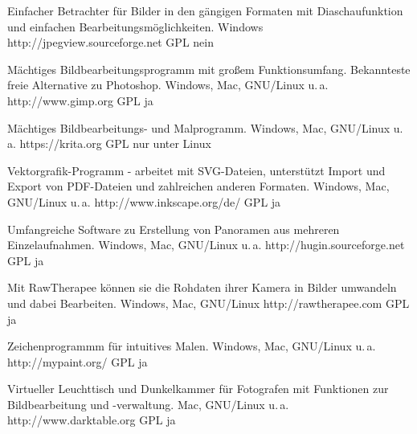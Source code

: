 



{Einfacher Betrachter für Bilder in den gängigen Formaten mit Diaschaufunktion und einfachen Bearbeitungsmöglichkeiten.}
{Windows}
{http://jpegview.sourceforge.net}
{GPL}
{nein}

{Mächtiges Bildbearbeitungsprogramm mit großem Funktionsumfang. Bekannteste freie Alternative zu Photoshop.}
{Windows, Mac, GNU/Linux u.\,a.}
{http://www.gimp.org}
{GPL}
{ja}

{Mächtiges Bildbearbeitungs- und Malprogramm.}
{Windows, Mac, GNU/Linux u.\,a.}
{https://krita.org}
{GPL}
{nur unter Linux}

{Vektorgrafik-Programm - arbeitet mit SVG-Dateien, unterstützt Import und Export von PDF-Dateien und zahlreichen anderen Formaten.}
{Windows, Mac, GNU/Linux u.\,a.}
{http://www.inkscape.org/de/}
{GPL}
{ja}


{Umfangreiche Software zu Erstellung von Panoramen aus mehreren Einzelaufnahmen.}
{Windows, Mac, GNU/Linux u.\,a.}
{http://hugin.sourceforge.net}
{GPL}
{ja}

{Mit RawTherapee können sie die Rohdaten ihrer Kamera in Bilder umwandeln und dabei Bearbeiten.}
{Windows, Mac, GNU/Linux}
{http://rawtherapee.com}
{GPL}
{ja}

{Zeichenprogrammm für intuitives Malen.}
{Windows, Mac, GNU/Linux u.\,a.}
{http://mypaint.org/}
{GPL}
{ja}

{Virtueller Leuchttisch und Dunkelkammer für Fotografen mit Funktionen zur Bildbearbeitung und -verwaltung.}
{Mac, GNU/Linux u.\,a.}
{http://www.darktable.org}
{GPL}
{ja}

\backpage


